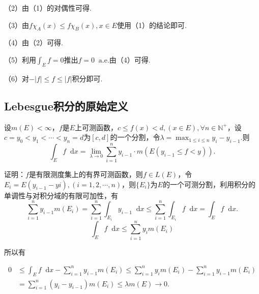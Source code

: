 \documentclass[bwprint, withoutpreface]{cumcmthesis}
\newcommand*{\dif}{\mathop{}\!\mathrm{d}}
\begin{document}
（2）由（1）的对偶性可得.

（3）由$f \chi_A(x) \leqslant f \chi_B(x), x \in E$使用（1）的结论即可.

（4）由（2）可得.

（5）利用$\int_E f = 0$推出$f = 0 \mathop{} \! \mathrm{a.e.}$由（4）可得.

（6）对$-|f| \leqslant f \leqslant |f|$积分即可.

\subsection{Lebesgue积分的原始定义}
设$m(E) < \infty$，$f$是$E$上可测函数，$c \leqslant f(x) < d,(x \in E), \forall n \in \mathbb{N}^+$，设$c = y_0 < y_1 < \cdots < y_n = d$为$[c, d]$的一个分割，令$\lambda = \max_{1 \leqslant i \leqslant n}{y_i - y_{i - 1}}$.则
\begin{equation*}
	\int_E f \dif x = \lim_{\lambda \to 0}{\sum_{i = 1}^{n}{y_{i - 1} \cdot m(E(y_{i - 1} \leqslant f < y))}}.
\end{equation*}

证明：$f$是有限测度集上的有界可测函数，则$f \in L(E)$，令$E_i = E(y_{i - 1} - y{i}), (i = 1, 2, \cdots, n)$，则$\{E_i\}$为$E$的一个可测分割，利用积分的单调性与对积分域的有限可加性，有
\begin{equation*}
	\sum_{i = 1}^{n}{y_{i - 1}} m(E_i) = \sum_{i = 1}^{n}{\int_{E_i} y_{i - 1} \dif x} \leqslant \sum_{i = 1}^{n}{\int_{E_i} f \dif x} = \int_E f \dif x.
\end{equation*}
\begin{equation*}
	\int_E f \dif x \leqslant \sum_{i = 1}^{n}{y_i m(E_i)}
\end{equation*}

所以有

\begin{align*}
	 0 & \leqslant \int_E f \dif x - \sum_{i = 1}^{n}{y_{i - 1}m(E_i)} \leqslant \sum_{i = 1}^{n}{y_i m(E_i)} - \sum_{i = 1}^{n}{y_{i - 1} m(E_i)} \\ 
	   & = \sum_{i = 1}^{n}{(y_i - y_{i - 1})} m(E_i) \leqslant \lambda m(E) \to 0.
\end{align*}

\begin{center}
\end{center}
\end{document}

